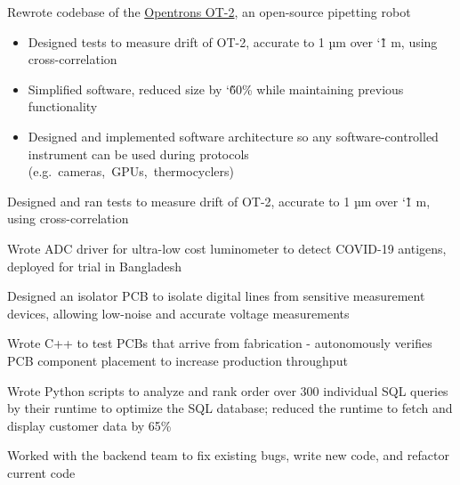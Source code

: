 \documentclass[]{deedy-resume-openfont}
\begin{document}
\begin{tightemize}
    \item Rewrote codebase of the \href{https://opentrons.com/ot-2/}{Opentrons OT-2}, an open-source pipetting robot
      \begin{itemize}
        \item Designed tests to measure drift of OT-2, accurate to 1 µm over \char`\~ 1 m, using cross-correlation
        \item Simplified software, reduced size by \char`\~ 60\% while maintaining previous functionality
        \item Designed and implemented software architecture so any software-controlled instrument can be used during protocols (e.g.\ cameras,\ GPUs,\ thermocyclers)
      \end{itemize}
    \item Designed and ran tests to measure drift of OT-2, accurate to 1 µm over \char`\~ 1 m, using cross-correlation
    \item Wrote ADC driver for ultra-low cost luminometer to detect COVID-19 antigens, deployed for trial in Bangladesh
\end{tightemize}

\vspace{8pt}

\begin{tightemize}
    \item Designed an isolator PCB to isolate digital lines from sensitive measurement devices, allowing low-noise and accurate voltage measurements
    \item Wrote C++ to test PCBs that arrive from fabrication - autonomously verifies PCB component placement to increase production throughput
\end{tightemize}

\vspace{8pt}


\begin{tightemize}
    \item Wrote Python scripts to analyze and rank order over 300 individual SQL queries by their runtime to optimize the SQL database; reduced the runtime to fetch and display customer data by 65\%
    \item Worked with the backend team to fix existing bugs, write new code, and refactor current code
\end{tightemize}
\end{document}
